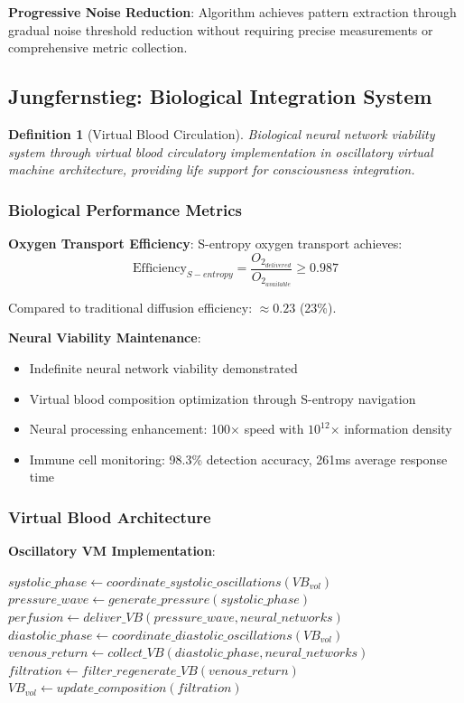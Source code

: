 \documentclass[12pt,a4paper]{article}
\newtheorem{definition}[theorem]{Definition}
\begin{document}
\textbf{Progressive Noise Reduction}:
Algorithm achieves pattern extraction through gradual noise threshold reduction without requiring precise measurements or comprehensive metric collection.

\subsection{Jungfernstieg: Biological Integration System}

\begin{definition}[Virtual Blood Circulation]
Biological neural network viability system through virtual blood circulatory implementation in oscillatory virtual machine architecture, providing life support for consciousness integration.
\end{definition}

\subsubsection{Biological Performance Metrics}

\textbf{Oxygen Transport Efficiency}:
S-entropy oxygen transport achieves:
$$\text{Efficiency}_{S-entropy} = \frac{O_2_{delivered}}{O_2_{available}} \geq 0.987$$

Compared to traditional diffusion efficiency: $\approx 0.23$ (23\%).

\textbf{Neural Viability Maintenance}:
\begin{itemize}
\item Indefinite neural network viability demonstrated
\item Virtual blood composition optimization through S-entropy navigation
\item Neural processing enhancement: 100× speed with $10^{12}$× information density
\item Immune cell monitoring: 98.3\% detection accuracy, 261ms average response time
\end{itemize}

\subsubsection{Virtual Blood Architecture}

\textbf{Oscillatory VM Implementation}:
\begin{algorithm}
\caption{Virtual Blood Circulation Protocol}
\begin{algorithmic}[1]
        \State $systolic\_phase \gets coordinate\_systolic\_oscillations(VB_{vol})$
        \State $pressure\_wave \gets generate\_pressure(systolic\_phase)$
        \State $perfusion \gets deliver\_VB(pressure\_wave, neural\_networks)$
        \State $diastolic\_phase \gets coordinate\_diastolic\_oscillations(VB_{vol})$
        \State $venous\_return \gets collect\_VB(diastolic\_phase, neural\_networks)$
        \State $filtration \gets filter\_regenerate\_VB(venous\_return)$
        \State $VB_{vol} \gets update\_composition(filtration)$
    \EndWhile
\EndProcedure
\end{algorithmic}
\end{algorithm}
\end{document}
